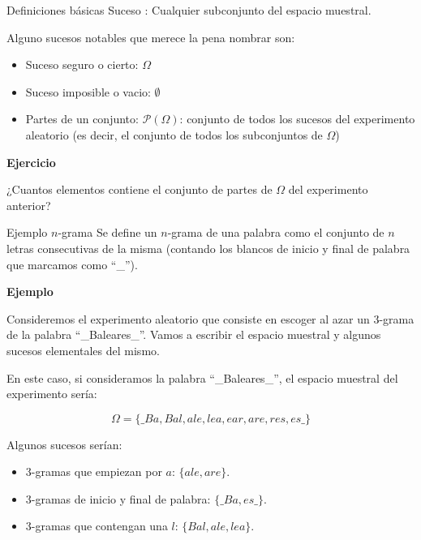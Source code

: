 \documentclass[
  ignorenonframetext,
]{beamer}
\providecommand{\tightlist}{%
  \setlength{\itemsep}{0pt}\setlength{\parskip}{0pt}}
\begin{document}
\begin{frame}{Definiciones básicas}
\protect\hypertarget{definiciones-buxe1sicas-2}{}
Suceso : Cualquier subconjunto del espacio muestral.

Alguno sucesos notables que merece la pena nombrar son:

\begin{itemize}
\tightlist
\item
  Suceso seguro o cierto: \(\Omega\)
\item
  Suceso imposible o vacio: \(\emptyset\)
\item
  Partes de un conjunto: \(\mathcal{P}(\Omega)\): conjunto de todos los
  sucesos del experimento aleatorio (es decir, el conjunto de todos los
  subconjuntos de \(\Omega\))
\end{itemize}

\textbf{Ejercicio}

¿Cuantos elementos contiene el conjunto de partes de \(\Omega\) del
experimento anterior?
\end{frame}

\begin{frame}{Ejemplo \(n\)-grama}
\protect\hypertarget{ejemplo-n-grama}{}
Se define un \(n\)-grama de una palabra como el conjunto de \(n\) letras
consecutivas de la misma (contando los blancos de inicio y final de
palabra que marcamos como ``\_'').

\textbf{Ejemplo}

Consideremos el experimento aleatorio que consiste en escoger al azar un
3-grama de la palabra ``\_Baleares\_''. Vamos a escribir el espacio
muestral y algunos sucesos elementales del mismo.

En este caso, si consideramos la palabra ``\_Baleares\_'', el espacio
muestral del experimento sería:

\[\Omega=\{\_Ba, Bal, ale, lea, ear, are, res, es\_\}\]

Algunos sucesos serían:

\begin{itemize}
\tightlist
\item
  3-gramas que empiezan por \(a\): \(\{ale,are\}.\)
\item
  3-gramas de inicio y final de palabra: \(\{\_Ba,es\_\}.\)
\item
  3-gramas que contengan una \(l\): \(\{Bal,ale,lea\}.\)
\end{itemize}
\end{frame}
\end{document}
